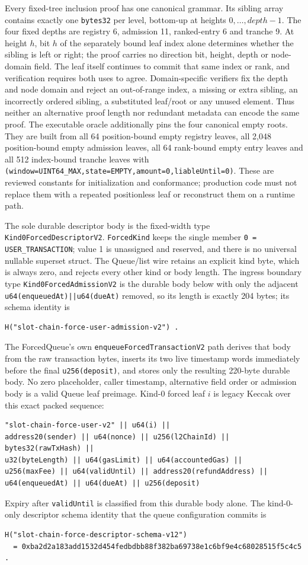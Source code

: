 \documentclass[a4paper,11pt]{article}
\newcommand{\code}[1]{\nolinkurl{#1}}
\begin{document}
Every fixed-tree inclusion proof has one canonical grammar.  Its sibling array
contains exactly one \code{bytes32} per level, bottom-up at heights
$0,\ldots,depth-1$.  The four fixed depths are registry 6, admission 11,
ranked-entry 6 and tranche 9.  At height $h$, bit $h$ of the separately bound
leaf index alone determines whether the sibling is left or right; the proof
carries no direction bit, height, depth or node-domain field.  The leaf itself
continues to commit that same index or rank, and verification requires both
uses to agree.  Domain-specific verifiers fix the depth and node domain and
reject an out-of-range index, a missing or extra sibling, an incorrectly
ordered sibling, a substituted leaf/root or any unused element.  Thus neither
an alternative proof length nor redundant metadata can encode the same proof.
The executable oracle additionally pins the four canonical empty roots.  They
are built from all 64 position-bound empty registry leaves, all 2,048
position-bound empty admission leaves, all 64 rank-bound empty entry leaves and
all 512 index-bound tranche leaves with
\code{(window=UINT64_MAX,state=EMPTY,amount=0,liableUntil=0)}.  These are reviewed
constants for initialization and conformance; production code must not replace
them with a repeated positionless leaf or reconstruct them on a runtime path.

The sole durable descriptor body is the fixed-width type
\code{Kind0ForcedDescriptorV2}.  \code{ForcedKind} keeps the single member
\code{0 = USER_TRANSACTION}; value 1 is unassigned and reserved, and there is
no universal nullable superset struct.  The Queue/list wire retains an explicit
kind byte, which is always zero, and rejects every other kind or body length.
The ingress boundary type \code{Kind0ForcedAdmissionV2} is the durable body
below with only the adjacent \code{u64(enqueuedAt)||u64(dueAt)} removed, so
its length is exactly 204 bytes; its schema identity is
\begin{verbatim}
H("slot-chain-force-user-admission-v2") .
\end{verbatim}
The ForcedQueue's own \code{enqueueForcedTransactionV2} path derives that body
from the raw transaction bytes, inserts its two live timestamp words
immediately before the final \code{u256(deposit)}, and stores only the
resulting 220-byte durable body.  No zero placeholder, caller timestamp,
alternative field order or admission body is a valid Queue leaf preimage.
Kind-0 forced leaf $i$ is legacy Keccak over this exact packed sequence:
\begin{verbatim}
"slot-chain-force-user-v2" || u64(i) ||
address20(sender) || u64(nonce) || u256(l2ChainId) || bytes32(rawTxHash) ||
u32(byteLength) || u64(gasLimit) || u64(accountedGas) ||
u256(maxFee) || u64(validUntil) || address20(refundAddress) ||
u64(enqueuedAt) || u64(dueAt) || u256(deposit)
\end{verbatim}
Expiry after \code{validUntil} is classified from this durable body alone.
The kind-0-only descriptor schema identity that the queue configuration
commits is
\begin{verbatim}
H("slot-chain-force-descriptor-schema-v12")
  = 0xba2d2a183add1532d454fedbdbb88f382ba69738e1c6bf9e4c68028515f5c4c5 .
\end{verbatim}
\end{document}
